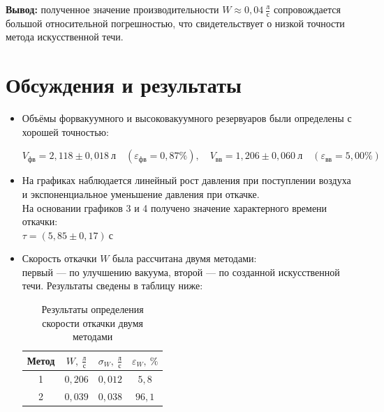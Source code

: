 \documentclass[a4paper,12pt]{article}
\begin{document}
    \textbf{Вывод:} полученное значение производительности $W \approx 0{,}04 \ \frac{\text{л}}{\text{с}}$ сопровождается большой относительной погрешностью, что свидетельствует о низкой точности метода искусственной течи.

    \section{Обсуждения и результаты}
    
    \begin{itemize}
    
    \item Объёмы форвакуумного и высоковакуумного резервуаров были определены с хорошей точностью:

    $V_\text{фв} = 2{,}118 \pm 0{,}018 \ \text{л} \quad (\varepsilon_\text{фв} = 0{,}87\%), \quad V_\text{вв} = 1{,}206 \pm 0{,}060 \ \text{л} \quad (\varepsilon_\text{вв} = 5{,}00\%)$

    
    \item На графиках наблюдается линейный рост давления при поступлении воздуха и экспоненциальное уменьшение давления при откачке. \\[0.5ex]
    На основании графиков 3 и 4 получено значение характерного времени откачки: \\[0.5ex]
    \begin{math}
        \tau = (5{,}85 \pm 0{,}17) \ \text{с}
    \end{math}
    
    \item Скорость откачки $W$ была рассчитана двумя методами: \\[0.5ex]
    первый — по улучшению вакуума, второй — по созданной искусственной течи. Результаты сведены в таблицу ниже:
    
    \begin{table}[H]
        \centering
        \begin{tabular}{|c|c|c|c|}
            \hline
            Метод & $W,\ \frac{\text{л}}{\text{с}}$ & $\sigma_W,\ \frac{\text{л}}{\text{с}}$ & $\varepsilon_W,\ \%$ \\
            \hline
            1 & $0{,}206$ & $0{,}012$ & $5{,}8$ \\
            \hline
            2 & $0{,}039$ & $0{,}038$ & $96{,}1$ \\
            \hline
        \end{tabular}
        \caption{Результаты определения скорости откачки двумя методами}
\end{table}


\end{itemize}
\end{document}
